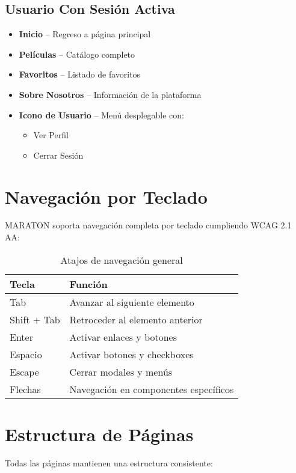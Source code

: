 \documentclass[11pt,a4paper,twoside]{book}
\begin{document}
\subsection{Usuario Con Sesión Activa}
\begin{itemize}
    \item \textbf{Inicio} -- Regreso a página principal
    \item \textbf{Películas} -- Catálogo completo
    \item \textbf{Favoritos} -- Listado de favoritos
    \item \textbf{Sobre Nosotros} -- Información de la plataforma
    \item \textbf{Icono de Usuario} -- Menú desplegable con:
    \begin{itemize}
        \item Ver Perfil
        \item Cerrar Sesión
    \end{itemize}
\end{itemize}

\section{Navegación por Teclado}

MARATON soporta navegación completa por teclado cumpliendo WCAG 2.1 AA:

\begin{table}[h]
\centering
\begin{tabular}{@{}ll@{}}
\toprule
\textbf{Tecla} & \textbf{Función} \\ \midrule
Tab & Avanzar al siguiente elemento \\
Shift + Tab & Retroceder al elemento anterior \\
Enter & Activar enlaces y botones \\
Espacio & Activar botones y checkboxes \\
Escape & Cerrar modales y menús \\
Flechas & Navegación en componentes específicos \\ \bottomrule
\end{tabular}
\caption{Atajos de navegación general}
\end{table}

\section{Estructura de Páginas}

Todas las páginas mantienen una estructura consistente:
\end{document}
